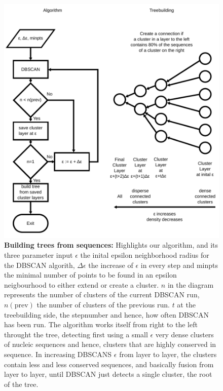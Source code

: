 \begin{figure}
  \begin{center}
  \includegraphics[scale=0.8]{algorithm.pdf}
  \end{center}
  \caption{\textbf{Building trees from sequences:} Highlights our
    algorithm, and its three parameter input $\epsilon$ the inital
    epsilon neighborhood radius for the DBSCAN algorith, $\Delta
    \epsilon$ the increase of $\epsilon$ in every step and minpts the
    minimal number of points to be found in an epsilon neigbourhood to
    either extend or create a cluster. $n$ in the
    diagram represents the number of clusters of the current DBSCAN
    run, $n(\mathrm{prev})$ the number of clusters of the previous
    run. $t$ at the treebuilding side, the stepnumber and hence, how
    often DBSCAN has been run.
    The algorithm works itself from right to the left throught the
    tree, detecting first using a small $\epsilon$ very dense clusters
    of nucleic sequences and hence, clusters that are highly conserved
    in sequence. In increasing DBSCANS $\epsilon$ from layer to layer,
    the clusters contain less and less conserved sequences, and
    basically fusion from layer to layer, until DBSCAN just detects a
    single cluster, the root of the tree.}
  \label{fig-adaptive-dbscan}
\end{figure}
